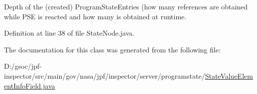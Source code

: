 Depth of the (created) Program\+State\+Entries (how many references are obtained while P\+SE is reacted and how many is obtained at runtime. 



Definition at line 38 of file State\+Node.\+java.



The documentation for this class was generated from the following file\+:\begin{DoxyCompactItemize}
\item 
D\+:/gsoc/jpf-\/inspector/src/main/gov/nasa/jpf/inspector/server/programstate/\hyperlink{_state_value_element_info_field_8java}{State\+Value\+Element\+Info\+Field.\+java}\end{DoxyCompactItemize}

